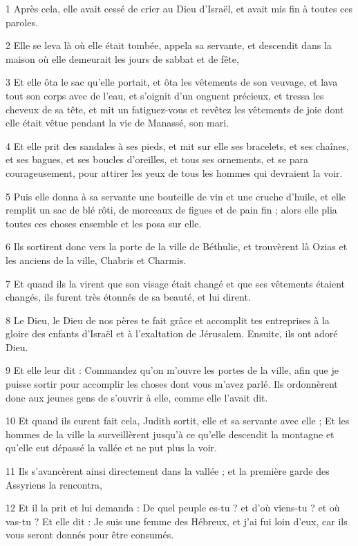 \par 1 Après cela, elle avait cessé de crier au Dieu d'Israël, et avait mis fin à toutes ces paroles.
\par 2 Elle se leva là où elle était tombée, appela sa servante, et descendit dans la maison où elle demeurait les jours de sabbat et de fête,
\par 3 Et elle ôta le sac qu'elle portait, et ôta les vêtements de son veuvage, et lava tout son corps avec de l'eau, et s'oignit d'un onguent précieux, et tressa les cheveux de sa tête, et mit un fatiguez-vous et revêtez les vêtements de joie dont elle était vêtue pendant la vie de Manassé, son mari.
\par 4 Et elle prit des sandales à ses pieds, et mit sur elle ses bracelets, et ses chaînes, et ses bagues, et ses boucles d'oreilles, et tous ses ornements, et se para courageusement, pour attirer les yeux de tous les hommes qui devraient la voir.
\par 5 Puis elle donna à sa servante une bouteille de vin et une cruche d'huile, et elle remplit un sac de blé rôti, de morceaux de figues et de pain fin ; alors elle plia toutes ces choses ensemble et les posa sur elle.
\par 6 Ils sortirent donc vers la porte de la ville de Béthulie, et trouvèrent là Ozias et les anciens de la ville, Chabris et Charmis.
\par 7 Et quand ils la virent que son visage était changé et que ses vêtements étaient changés, ils furent très étonnés de sa beauté, et lui dirent.
\par 8 Le Dieu, le Dieu de nos pères te fait grâce et accomplit tes entreprises à la gloire des enfants d'Israël et à l'exaltation de Jérusalem. Ensuite, ils ont adoré Dieu.
\par 9 Et elle leur dit : Commandez qu'on m'ouvre les portes de la ville, afin que je puisse sortir pour accomplir les choses dont vous m'avez parlé. Ils ordonnèrent donc aux jeunes gens de s'ouvrir à elle, comme elle l'avait dit.
\par 10 Et quand ils eurent fait cela, Judith sortit, elle et sa servante avec elle ; Et les hommes de la ville la surveillèrent jusqu'à ce qu'elle descendit la montagne et qu'elle eut dépassé la vallée et ne put plus la voir.
\par 11 Ils s'avancèrent ainsi directement dans la vallée ; et la première garde des Assyriens la rencontra,
\par 12 Et il la prit et lui demanda : De quel peuple es-tu ? et d'où viens-tu ? et où vas-tu ? Et elle dit : Je suis une femme des Hébreux, et j'ai fui loin d'eux, car ils vous seront donnés pour être consumés.
